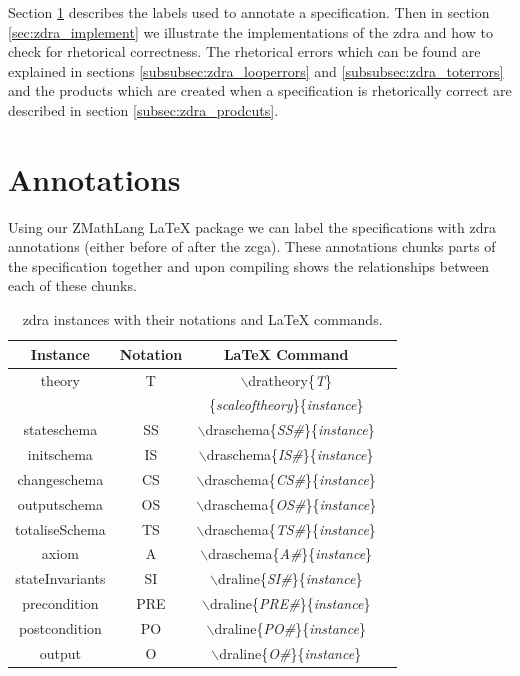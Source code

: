 Section \ref{sec:zdra_annotate} describes the labels used to annotate a
specification. Then in section \ref{sec:zdra_implement} we illustrate the
implementations of the \gls{zdra} and how to check for rhetorical correctness.
The rhetorical errors which can be found are explained in sections
\ref{subsubsec:zdra_looperrors} and \ref{subsubsec:zdra_toterrors} and the
products which are created when a specification is rhetorically correct are
described in section \ref{subsec:zdra_prodcuts}.

\section{Annotations}
\label{sec:zdra_annotate}

Using our ZMathLang \LaTeX{} package we can label the specifications with
\gls{zdra} annotations (either before of after the \gls{zcga}). These
annotations chunks parts of the specification together and upon compiling shows
the relationships between each of these chunks.

\begin{table}[H]
\begin{tabular}{| c | c | c | c |}
\hline
\textbf{Instance} & \textbf{Notation} & \textbf{\LaTeX{} Command}  \\
\hline
theory & T & $\backslash$dratheory\{\textit{T}\}\\
& & \{\textit{scaleoftheory}\}\{\textit{instance}\}  \\
\hline
stateschema & SS & $\backslash$draschema\{\textit{SS\#}\}\{\textit{instance}\}
\\
\hline
initschema & IS & $\backslash$draschema\{\textit{IS\#}\}\{\textit{instance}\}
\\
\hline
changeschema & CS & $\backslash$draschema\{\textit{CS\#}\}\{\textit{instance}\}
\\
\hline
outputschema & OS & $\backslash$draschema\{\textit{OS\#}\}\{\textit{instance}\}
\\
\hline
totaliseSchema & TS &
$\backslash$draschema\{\textit{TS\#}\}\{\textit{instance}\}  \\
\hline
axiom & A  & $\backslash$draschema\{\textit{A\#}\}\{\textit{instance}\}  \\
\hline
stateInvariants & SI & $\backslash$draline\{\textit{SI\#}\}\{\textit{instance}\}
\\
\hline
precondition & PRE & $\backslash$draline\{\textit{PRE\#}\}\{\textit{instance}\}
\\
\hline
postcondition & PO  & $\backslash$draline\{\textit{PO\#}\}\{\textit{instance}\}
\\
\hline
output & O  & $\backslash$draline\{\textit{O\#}\}\{\textit{instance}\}  \\
\hline
\end{tabular}
\caption{\label{tab:instances} \gls{zdra} instances with their notations and \LaTeX{} commands.}
\end{table}

